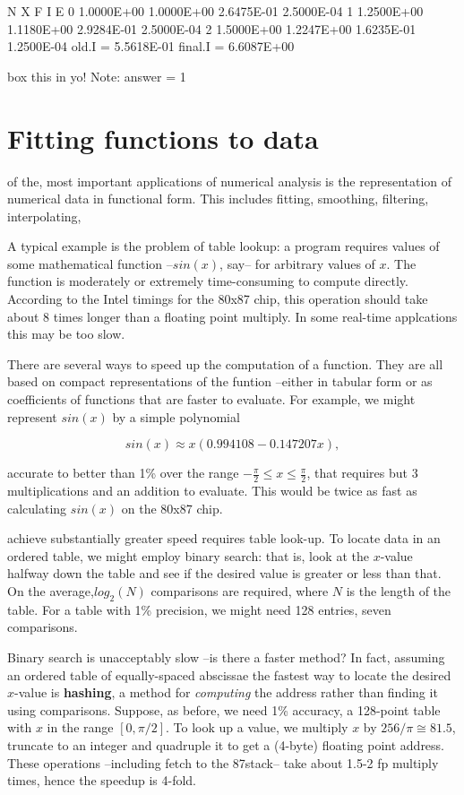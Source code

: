 N      X            F          I             E
0 1.0000E+00  1.0000E+00 2.6475E-01 2.5000E-04
1 1.2500E+00  1.1180E+00 2.9284E-01 2.5000E-04
2 1.5000E+00  1.2247E+00 1.6235E-01 1.2500E-04
old.I = 5.5618E-01    final.I = 6.6087E+00

box this in yo!
Note:
    answer = 1

\section{Fitting functions to data}
 of the, most important applications of numerical analysis is the representation of numerical data in functional form. This includes fitting, smoothing, filtering, interpolating, \etc

A typical example is the problem of table lookup: a program requires values of some mathematical function --$sin(x)$, say-- for arbitrary values of $x$. The function is moderately or extremely time-consuming to compute directly. According to the Intel timings for the 80x87 chip, this operation should take about 8 times longer than a floating point multiply. In some real-time applcations this may be too slow.

There are several ways to speed up the computation of a function. They are all based on compact representations of the funtion --either in tabular form or as coefficients of functions that are faster to evaluate. For example, we might represent $sin(x)$ by a simple polynomial

\begin{equation}
sin(x) \approx x \left( 0.994108 - 0.147207x\right),
\end{equation}

accurate to better than 1\% over the range $-\frac{\pi}{2}\leq x \leq \frac{\pi}{2}$, that requires but 3 multiplications and an addition to evaluate. This would be twice as fast as calculating $sin(x)$ on the 80x87 chip.

 achieve substantially greater speed requires table look-up. To locate data in an ordered table, we might employ binary search: that is, look at the $x$-value halfway down the table and see if the desired value is greater or less than that. On the average,$log_{2}(N)$ comparisons are required, where $N$ is the length of the table. For a table with 1\% precision, we might need 128 entries, \ie seven comparisons.

Binary search is unacceptably slow --is there a faster method? In fact, assuming an ordered table of equally-spaced abscissae the fastest way to locate the desired $x$-value is \textbf{hashing}, a method for \textit{computing} the address rather than finding it using comparisons. Suppose, as before, we need 1\% accuracy, \ie a 128-point table with $x$ in the range $[0,\pi/2]$. To look up a value, we multiply $x$ by $256/\pi \cong 81.5$, truncate to an integer and quadruple it to get a (4-byte) floating point address. These operations --including fetch to the 87stack-- take about 1.5-2 fp multiply times, hence the speedup is 4-fold.

